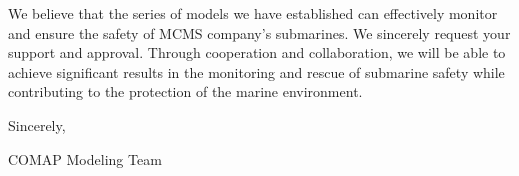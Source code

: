 \documentclass[12pt]{article}
\begin{document}
We believe that the series of models we have established can effectively monitor and ensure the safety of MCMS company's submarines. We sincerely request your support and approval. Through cooperation and collaboration, we will be able to achieve significant results in the monitoring and rescue of submarine safety while contributing to the protection of the marine environment.


\begin{flushright}
    Sincerely,
    
    COMAP Modeling Team
\end{flushright}
\end{document}
